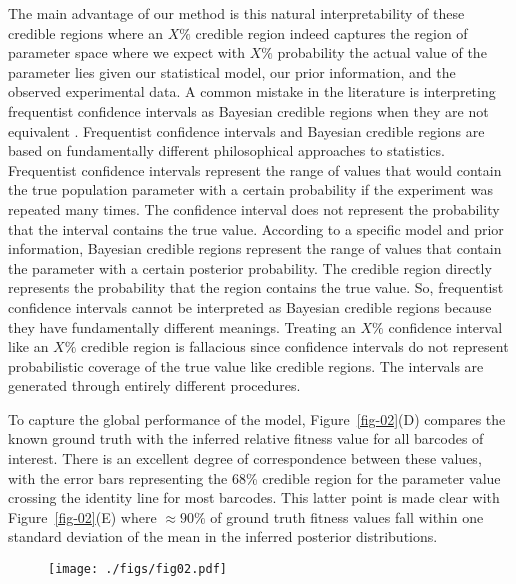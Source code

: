 \documentclass[
]{scrartcl}
\begin{document}
\begin{refsegment}
The main advantage of our method is this natural interpretability of
these credible regions where an \(X\%\) credible region indeed captures
the region of parameter space where we expect with \(X\%\) probability
the actual value of the parameter lies given our statistical model, our
prior information, and the observed experimental data. A common mistake
in the literature is interpreting frequentist confidence intervals as
Bayesian credible regions when they are not equivalent
\autocite{morey2016}. Frequentist confidence intervals and Bayesian
credible regions are based on fundamentally different philosophical
approaches to statistics. Frequentist confidence intervals represent the
range of values that would contain the true population parameter with a
certain probability if the experiment was repeated many times. The
confidence interval does not represent the probability that the interval
contains the true value. According to a specific model and prior
information, Bayesian credible regions represent the range of values
that contain the parameter with a certain posterior probability. The
credible region directly represents the probability that the region
contains the true value. So, frequentist confidence intervals cannot be
interpreted as Bayesian credible regions because they have fundamentally
different meanings. Treating an \(X\%\) confidence interval like an
\(X\%\) credible region is fallacious since confidence intervals do not
represent probabilistic coverage of the true value like credible
regions. The intervals are generated through entirely different
procedures.

To capture the global performance of the model, Figure~\ref{fig-02}(D)
compares the known ground truth with the inferred relative fitness value
for all barcodes of interest. There is an excellent degree of
correspondence between these values, with the error bars representing
the 68\% credible region for the parameter value crossing the identity
line for most barcodes. This latter point is made clear with
Figure~\ref{fig-02}(E) where \(\approx 90\%\) of ground truth fitness
values fall within one standard deviation of the mean in the inferred
posterior distributions.

\begin{figure}

{\centering \texttt{[image: ./figs/fig02.pdf]}

}


\end{figure}
\end{refsegment}
\end{document}
